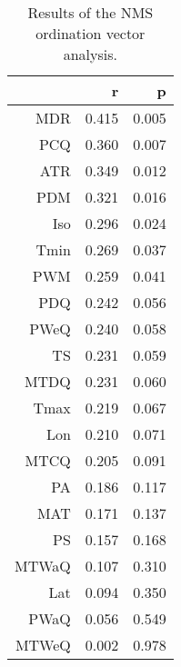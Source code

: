 \begin{table}[ht]
\centering
\begin{tabular}{rrr}
  \hline
 & r & p \\ 
  \hline
MDR & 0.415 & 0.005 \\ 
  PCQ & 0.360 & 0.007 \\ 
  ATR & 0.349 & 0.012 \\ 
  PDM & 0.321 & 0.016 \\ 
  Iso & 0.296 & 0.024 \\ 
  Tmin & 0.269 & 0.037 \\ 
  PWM & 0.259 & 0.041 \\ 
  PDQ & 0.242 & 0.056 \\ 
  PWeQ & 0.240 & 0.058 \\ 
  TS & 0.231 & 0.059 \\ 
  MTDQ & 0.231 & 0.060 \\ 
  Tmax & 0.219 & 0.067 \\ 
  Lon & 0.210 & 0.071 \\ 
  MTCQ & 0.205 & 0.091 \\ 
  PA & 0.186 & 0.117 \\ 
  MAT & 0.171 & 0.137 \\ 
  PS & 0.157 & 0.168 \\ 
  MTWaQ & 0.107 & 0.310 \\ 
  Lat & 0.094 & 0.350 \\ 
  PWaQ & 0.056 & 0.549 \\ 
  MTWeQ & 0.002 & 0.978 \\ 
   \hline
\end{tabular}
\caption{Results of the NMS ordination vector analysis.} 
\end{table}
